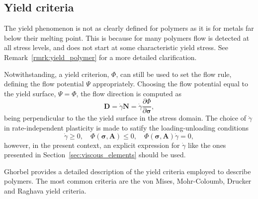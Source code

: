
\subsection{Yield criteria}

The yield phenomenon is not as clearly defined for polymers as it is for metals far below their melting point.
This is because for many polymers flow is detected at all stress levels, and does not start at some characteristic yield stress.
See Remark~\ref{rmrk:yield_polymer} for a more detailed clarification.

Notwithstanding, a yield criterion, $\Phi$, can still be used to set the flow rule, defining the flow potential $\Psi$ appropriately.
Choosing the flow potential equal to the yield surface, $\Psi = \Phi$, the flow direction is computed as
\begin{equation}
	\mathbf D = \dot \gamma \mathbf N = \dot \gamma \frac{\partial \Phi}{\partial \bm \sigma},
\end{equation}
being perpendicular to the the yield surface in the stress domain.
The choice of $\dot \gamma$ in rate-independent plasticity is made to satify the loading-unloading conditions
\begin{equation}
	\dot\gamma \geq 0,\quad \Phi(\bm \sigma, \mathbf A) \leq 0,\quad \Phi(\bm \sigma, \mathbf A) \dot \gamma = 0,
\end{equation}
however, in the present context, an explicit expression for $\dot \gamma$ like the ones presented in Section~\ref{sec:viscous_elements} should be used.

Ghorbel \citep{ghorbelViscoplasticConstitutiveModel2008} provides a detailed description of the yield criteria employed to describe polymers.
The most common criteria are the von Mises, Mohr-Coloumb, Drucker and Raghava yield \citep{balieuNonassociatedViscoplasticityCoupled2014} criteria.

%

